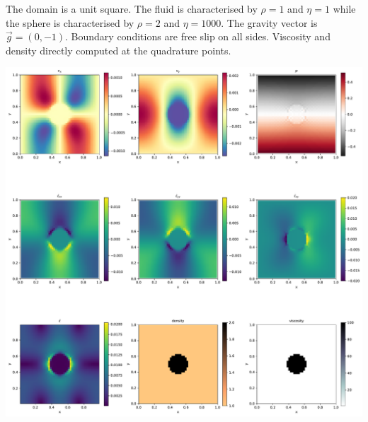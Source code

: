 The domain is a unit square. The fluid is characterised 
by $\rho=1$ and $\eta=1$ 
while the sphere is characterised 
by $\rho=2$ and $\eta=1000$.
The gravity vector is $\vec{g}=(0,-1)$. 
Boundary conditions are free slip on all sides.
Viscosity and density directly computed at the quadrature points.


\includegraphics[width=16cm]{python_codes/fieldstone_02/solution.pdf}

